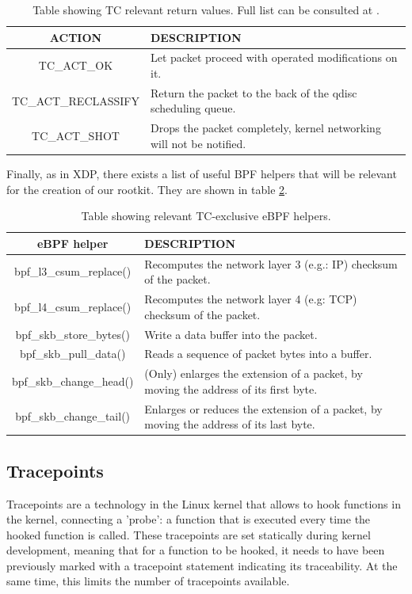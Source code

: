 \documentclass[12pt]{report} %
\begin{document}
\begin{table}[H]
\begin{tabular}{|c|>{\centering\arraybackslash}p{10cm}|}
\hline
ACTION & DESCRIPTION\\
\hline
\hline
TC\_ACT\_OK & Let packet proceed with operated modifications on it.\\
\hline
TC\_ACT\_RECLASSIFY & Return the packet to the back of the qdisc scheduling queue.\\
\hline
TC\_ACT\_SHOT & Drops the packet completely, kernel networking will not be notified.\\
\hline
\end{tabular}
\caption{Table showing TC relevant return values. Full list can be consulted at \cite{tc_ret_list_complete}.}
\label{table:tc_actions}
\end{table}

Finally, as in XDP, there exists a list of useful BPF helpers that will be relevant for the creation of our rootkit. They are shown in table \ref{table:tc_helpers}.
\begin{table}[H]
\begin{tabular}{|c|>{\centering\arraybackslash}p{10cm}|}
\hline
eBPF helper & DESCRIPTION\\
\hline
\hline
bpf\_l3\_csum\_replace() & Recomputes the network layer 3 (e.g.: IP) checksum of the packet.\\
\hline
bpf\_l4\_csum\_replace() & Recomputes the network layer 4 (e.g: TCP) checksum of the packet.\\
\hline
bpf\_skb\_store\_bytes() & Write a data buffer into the packet.\\
\hline
bpf\_skb\_pull\_data() & Reads a sequence of packet bytes into a buffer.\\
\hline
bpf\_skb\_change\_head() & (Only) enlarges the extension of a packet, by moving the address of its first byte.\\
\hline
bpf\_skb\_change\_tail() & Enlarges or reduces the extension of a packet, by moving the address of its last byte.\\
\hline
\hline
\end{tabular}
\caption{Table showing relevant TC-exclusive eBPF helpers.}
\label{table:tc_helpers}
\end{table}


\subsection{Tracepoints} \label{subsection:tracepoints}
Tracepoints are a technology in the Linux kernel that allows to hook functions in the kernel, connecting a 'probe': a function that is executed every time the hooked function is called\cite{tp_kernel}. These tracepoints are set statically during kernel development, meaning that for a function to be hooked, it needs to have been previously marked with a tracepoint statement indicating its traceability. At the same time, this limits the number of tracepoints available.
\end{document}
